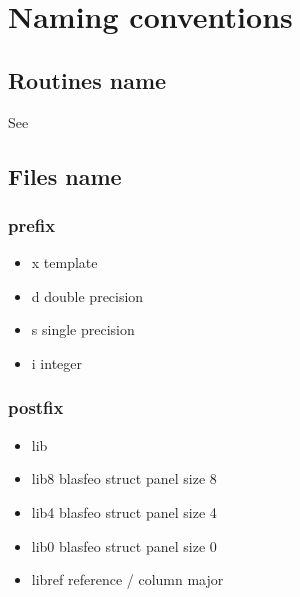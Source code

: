 \chapter{Naming conventions}


\section{Routines name}
See 

\section{Files name}

\subsection{prefix}
\begin{itemize}
\item x template
\item d double precision
\item s single precision
\item i integer
\end{itemize}


\subsection{postfix}
\begin{itemize}
\item lib
\item lib8 blasfeo struct panel size 8
\item lib4 blasfeo struct panel size 4
\item lib0 blasfeo struct panel size 0 
\item libref reference / column major
\end{itemize}

